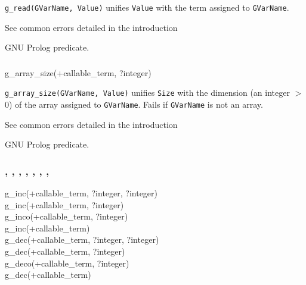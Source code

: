 \Description

\texttt{g\_read(GVarName, Value)} unifies \texttt{Value} with the term
assigned to \texttt{GVarName}.

\Errors

See common errors detailed in the introduction 

\Portability

GNU Prolog predicate.

\subsubsection{}

\begin{TemplatesOneCol}
g\_array\_size(+callable\_term, ?integer)

\end{TemplatesOneCol}

\Description

\texttt{g\_array\_size(GVarName, Value)} unifies \texttt{Size} with the
dimension (an integer $>$ 0) of the array assigned to \texttt{GVarName}.
Fails if \texttt{GVarName} is not an array.

\Errors

See common errors detailed in the introduction 

\begin{PlErrorsNoTitle}


\end{PlErrorsNoTitle}

\Portability

GNU Prolog predicate.

\subsubsection{,
               ,
               ,
               ,
               ,
               ,
               ,
               }

\begin{TemplatesOneCol}
g\_inc(+callable\_term, ?integer, ?integer) \\
g\_inc(+callable\_term, ?integer) \\
g\_inco(+callable\_term, ?integer) \\
g\_inc(+callable\_term) \\
g\_dec(+callable\_term, ?integer, ?integer) \\
g\_dec(+callable\_term, ?integer) \\
g\_deco(+callable\_term, ?integer) \\
g\_dec(+callable\_term)

\end{TemplatesOneCol}

